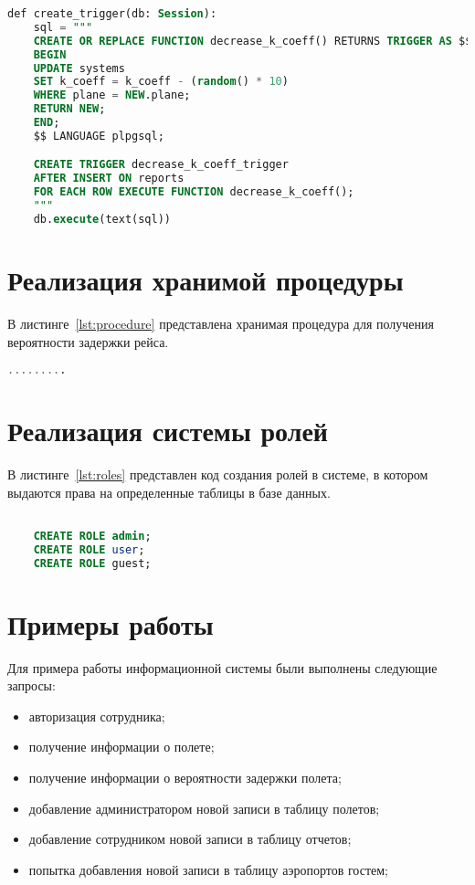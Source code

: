 \begin{lstlisting}[language=SQL, label=lst:trigger, caption=Триггер для обновления данных в таблице system]
def create_trigger(db: Session):
    sql = """
    CREATE OR REPLACE FUNCTION decrease_k_coeff() RETURNS TRIGGER AS $$
    BEGIN
    UPDATE systems
    SET k_coeff = k_coeff - (random() * 10)
    WHERE plane = NEW.plane;
    RETURN NEW;
    END;
    $$ LANGUAGE plpgsql;

    CREATE TRIGGER decrease_k_coeff_trigger
    AFTER INSERT ON reports
    FOR EACH ROW EXECUTE FUNCTION decrease_k_coeff();
    """
    db.execute(text(sql))
\end{lstlisting}

\section{Реализация хранимой процедуры}
В листинге~\ref{lst:procedure} представлена хранимая процедура для получения вероятности задержки рейса.

\begin{lstlisting}[language=SQL, label=lst:procedure, caption=Хранимая процедура для получения вероятности задержки рейса]
    .........
\end{lstlisting}

\section{Реализация системы ролей}

В листинге~\ref{lst:roles} представлен код создания ролей в системе, в котором выдаются права на определенные таблицы в базе данных.

\begin{lstlisting}[language=SQL, label=lst:roles, caption=Создание ролей в системе]

    CREATE ROLE admin;
    CREATE ROLE user;
    CREATE ROLE guest;


\end{lstlisting}

\section{Примеры работы}

Для примера работы информационной системы были выполнены следующие запросы:
\begin{itemize}
    \item авторизация сотрудника;
    \item получение информации о полете;
    \item получение информации о вероятности задержки полета;
    \item добавление администратором новой записи в таблицу полетов;
    \item добавление сотрудником новой записи в таблицу отчетов;
    \item попытка добавления новой записи в таблицу аэропортов гостем;
\end{itemize}

